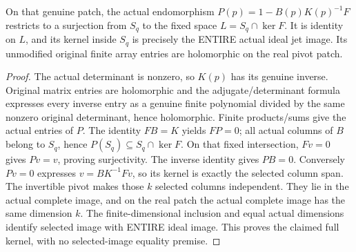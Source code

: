 \begin{lemma}
\label{hir:actual-holomorphic-pivot-whole-kernel}
\leanok
{}
On that genuine patch, the actual endomorphism
$P(p)=1-B(p)K(p)^{-1}F$ restricts to a surjection from $S_q$ to the fixed space
$L=S_q\cap\ker F$. It is identity on $L$, and its kernel inside $S_q$ is precisely
the ENTIRE actual ideal jet image. Its unmodified original finite array entries
are holomorphic on the real pivot patch.
\end{lemma}
\begin{proof}
The actual determinant is nonzero, so $K(p)$ has its genuine inverse. Original
matrix entries are holomorphic and the adjugate/determinant formula expresses
every inverse entry as a genuine finite polynomial divided by the same nonzero
original determinant, hence holomorphic. Finite products/sums give the actual
entries of $P$. The identity $FB=K$ yields $FP=0$; all actual columns of $B$
belong to $S_q$, hence $P(S_q)\subseteq S_q\cap\ker F$. On that fixed intersection,
$Fv=0$ gives $Pv=v$, proving surjectivity. The inverse identity gives $PB=0$.
Conversely $Pv=0$ expresses $v=B K^{-1}Fv$, so its kernel is exactly the selected
column span. The invertible pivot makes those $k$ selected columns independent.
They lie in the actual complete image, and on the real patch the actual complete
image has the same dimension $k$. The finite-dimensional inclusion and equal
actual dimensions identify selected image with ENTIRE ideal image. This proves
the claimed full kernel, with no selected-image equality premise.
\end{proof}

